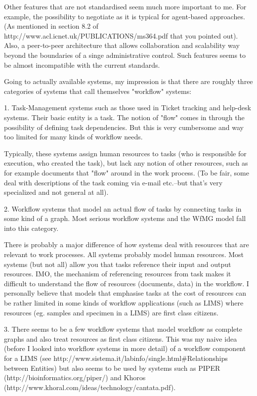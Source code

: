 Other features that are not standardised seem much more important to
me.  For example, the possibility to negotiate as it is typical for
agent-based approaches. (As mentioned in section 8.2 of
http://www.acl.icnet.uk/PUBLICATIONS/ms364.pdf that you pointed
out).  Also, a peer-to-peer architecture that allows collaboration and
scalability way beyond the boundaries of a singe administrative
control.  Such features seems to be almost incompatible with the current
standards.

Going to actually available systems, my impression is that there are
roughly three categories of systems that call themselves "workflow" systems:

1. Task-Management systems such as those used in Ticket tracking and
help-desk systems.  Their basic entity is a task.  The notion of "flow"
comes in through the possibility of defining task dependencies.  But this
is very cumbersome and way too limited for many kinds of workflow needs.

Typically, these systems assign human resources to tasks (who is
responsible for execution, who created the task), but lack any notion of
other resources, such as for example documents that "flow" around in the
work process.  (To be fair, some deal with descriptions of the task coming
via e-mail etc.--but that's very specialized and not general at all).

2. Workflow systems that model an actual flow of tasks by connecting tasks
in some kind of a graph.  Most serious workflow systems and the WfMG model
fall into this category.

There is probably a major difference of how systems deal with resources
that are relevant to work processes.  All systems probably model human
resources.  Most systems (but not all) allow you that tasks reference their
input and output resources.  IMO, the mechanism of referencing resources
from task makes it difficult to understand the flow of resources
(documents, data) in the workflow.  I personally believe that models that
emphasise tasks at the cost of resources can be rather limited in some
kinds of workflow applications (such as LIMS) where resources (eg. samples
and specimen in a LIMS) are first class citizens.

3. There seems to be a few workflow systems that model workflow as complete
graphs and also treat resources as first class citizens.  This was my naive
idea (before I looked into workflow systems in more detail) of a workflow
component for a LIMS (see
http://www.sistema.it/labinfo/single.html#Relationships between Entities)
but also seems to be used by systems such as PIPER
(http://bioinformatics.org/piper/) and Khoros
(http://www.khoral.com/ideas/technology/cantata.pdf).


